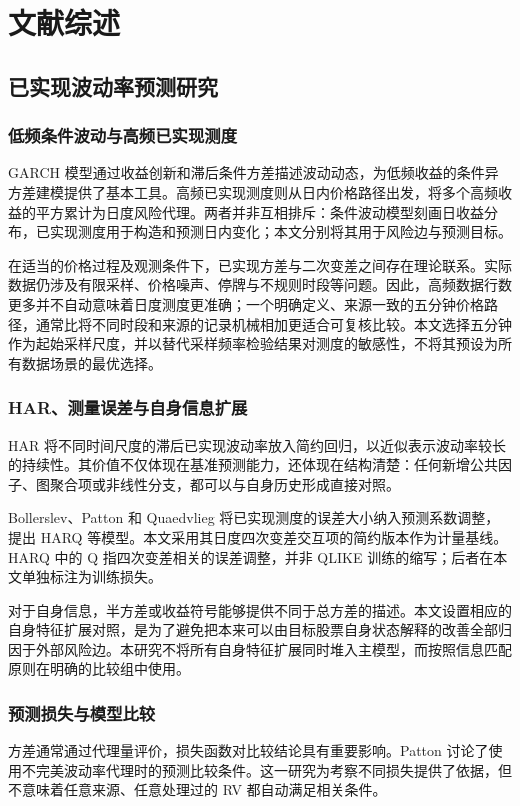 \chapter{文献综述}
\section{已实现波动率预测研究}
\subsection{低频条件波动与高频已实现测度}
GARCH 模型通过收益创新和滞后条件方差描述波动动态，为低频收益的条件异方差建模提供了基本工具\cite{bollerslev1986}。高频已实现测度则从日内价格路径出发，将多个高频收益的平方累计为日度风险代理。两者并非互相排斥：条件波动模型刻画日收益分布，已实现测度用于构造和预测日内变化；本文分别将其用于风险边与预测目标。

在适当的价格过程及观测条件下，已实现方差与二次变差之间存在理论联系\cite{andersen2003}。实际数据仍涉及有限采样、价格噪声、停牌与不规则时段等问题。因此，高频数据行数更多并不自动意味着日度测度更准确；一个明确定义、来源一致的五分钟价格路径，通常比将不同时段和来源的记录机械相加更适合可复核比较。本文选择五分钟作为起始采样尺度，并以替代采样频率检验结果对测度的敏感性，不将其预设为所有数据场景的最优选择。

\subsection{HAR、测量误差与自身信息扩展}
HAR 将不同时间尺度的滞后已实现波动率放入简约回归，以近似表示波动率较长的持续性\cite{corsi2009}。其价值不仅体现在基准预测能力，还体现在结构清楚：任何新增公共因子、图聚合项或非线性分支，都可以与自身历史形成直接对照。

Bollerslev、Patton 和 Quaedvlieg 将已实现测度的误差大小纳入预测系数调整，提出 HARQ 等模型\cite{bpq2016}。本文采用其日度四次变差交互项的简约版本作为计量基线。HARQ 中的 Q 指四次变差相关的误差调整，并非 QLIKE 训练的缩写；后者在本文单独标注为训练损失。

对于自身信息，半方差或收益符号能够提供不同于总方差的描述。本文设置相应的自身特征扩展对照，是为了避免把本来可以由目标股票自身状态解释的改善全部归因于外部风险边。本研究不将所有自身特征扩展同时堆入主模型，而按照信息匹配原则在明确的比较组中使用。

\subsection{预测损失与模型比较}
方差通常通过代理量评价，损失函数对比较结论具有重要影响。Patton 讨论了使用不完美波动率代理时的预测比较条件\cite{patton2011}。这一研究为考察不同损失提供了依据，但不意味着任意来源、任意处理过的 RV 都自动满足相关条件。

